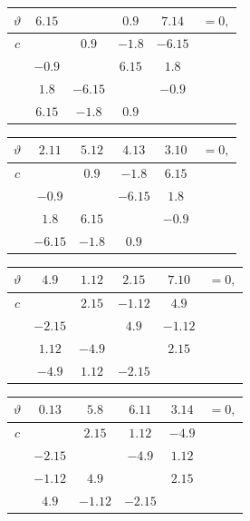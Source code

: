 \documentclass[11pt]{article}
\begin{document}
{\smallskip
\begin{center}
\begin{tabular}{c|cccc|c}\hline
$\vartheta$ & $6.15$ & & $0.9$ & $7.14$ & $=0,$\\\hline
$c$ & & $0.9$ & $-1.8$ & $-6.15$ & \\
& $-0.9$ & & $6.15$ & $1.8$ & \\
& $1.8$ & $-6.15$ & & $-0.9$ & \\
& $6.15$ & $-1.8$ & $0.9$ & & \\\hline
\end{tabular}
\hspace{0.8em}
\begin{tabular}{c|cccc|c}\hline
$\vartheta$ & $2.11$ & $5.12$ & $4.13$ & $3.10$ & $=0,$\\\hline
$c$ & & $0.9$ & $-1.8$ & $6.15$ & \\
& $-0.9$ & & $-6.15$ & $1.8$ & \\
& $1.8$ & $6.15$ & & $-0.9$ & \\
& $-6.15$ & $-1.8$ & $0.9$ & & \\\hline
\end{tabular}
\end{center}

\smallskip
\begin{center}
\begin{tabular}{c|cccc|c}\hline
$\vartheta$ & $4.9$ & $1.12$ & $2.15$ & $7.10$ & $=0,$\\\hline
$c$ & & $2.15$ & $-1.12$ & $4.9$ & \\
& $-2.15$ & & $4.9$ & $-1.12$ & \\
& $1.12$ & $-4.9$ & & $2.15$ & \\
& $-4.9$ & $1.12$ & $-2.15$ & & \\\hline
\end{tabular}
\hspace{0.8em}
\begin{tabular}{c|cccc|c}\hline
$\vartheta$ & $0.13$ & $5.8$ & $6.11$ & $3.14$ & $=0,$\\\hline
$c$ & & $2.15$ & $1.12$ & $-4.9$ & \\
& $-2.15$ & & $-4.9$ & $1.12$ & \\
& $-1.12$ & $4.9$ & & $2.15$ & \\
& $4.9$ & $-1.12$ & $-2.15$ & & \\\hline
\end{tabular}
\end{center}

}
\end{document}
